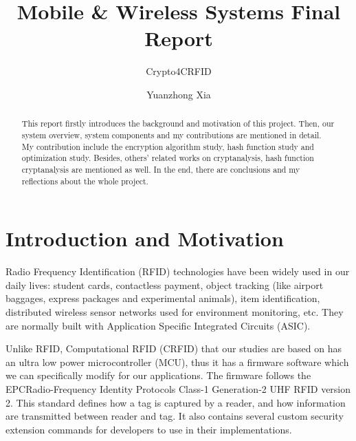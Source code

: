 \documentclass[sigconf, review=false]{acmart}
\begin{document}
\title{Mobile \& Wireless Systems Final Report}
\subtitle{Crypto4CRFID}

\author{Yuanzhong Xia}

\begin{abstract}
    This report firstly introduces the background and motivation of this project.
    Then, our system overview, system components and my contributions are mentioned in detail.
    My contribution include the encryption algorithm study, hash function study and optimization study.
    Besides, others' related works on cryptanalysis, hash function cryptanalysis are mentioned as well.
    In the end, there are conclusions and my reflections about the whole project.
\end{abstract}
\maketitle



\section{Introduction and Motivation}
Radio Frequency Identification (RFID) technologies have been widely used in our daily lives:
student cards, contactless payment, object tracking (like airport baggages, express packages and experimental animals),
item identification, distributed wireless sensor networks used for environment monitoring, etc. \cite{wikipedia2017rfid}
They are normally built with Application Specific Integrated Circuits (ASIC).

Unlike RFID, Computational RFID (CRFID) that our studies are based on has an ultra low power microcontroller (MCU),
thus it has a firmware software which we can specifically modify for our applications.
The firmware follows the EPC\texttrademark Radio-Frequency Identity Protocols Class-1 Generation-2 UHF RFID version 2\cite{epcglobal2013}.
This standard defines how a tag is captured by a reader, and how information are transmitted between reader and tag.
It also contains several custom security extension commands for developers to use in their implementations.
\end{document}
